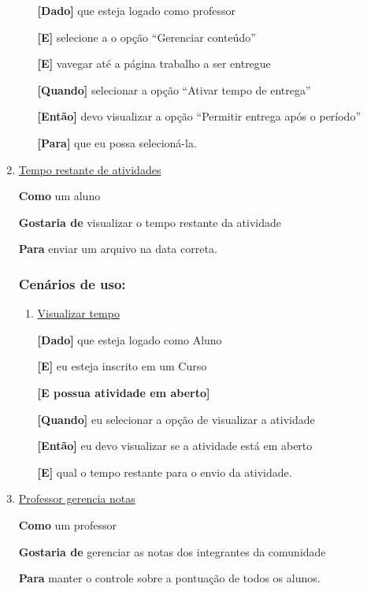 \begin{enumerate}
\begin{enumerate}
\textbf{[Dado]} que esteja logado como professor

\textbf{[E]} selecione a o opção ``Gerenciar conteúdo''

\textbf{[E]} vavegar até a página trabalho a ser entregue

\textbf{[Quando]} selecionar a opção ``Ativar tempo de entrega''

\textbf{[Então]} devo visualizar a opção ``Permitir entrega após o período''

\textbf{[Para]} que eu possa selecioná-la.

\end{enumerate}
\item \underline{Tempo restante de atividades}

\textbf{Como} um aluno

\textbf{Gostaria de} visualizar o tempo restante da atividade

\textbf{Para} enviar um arquivo na data correta.

\subsubsection*{Cenários de uso:}

\begin{enumerate}
\item \underline{Visualizar tempo}

\textbf{[Dado]} que esteja logado como Aluno

\textbf{[E]} eu esteja inscrito em um Curso

\textbf{[E possua atividade em aberto]}

\textbf{[Quando]} eu selecionar a opção de visualizar a atividade

\textbf{[Então]} eu devo visualizar se a atividade está em aberto

\textbf{[E]} qual o tempo restante para o envio da atividade.

\end{enumerate}

\item \underline{Professor gerencia notas}

\textbf{Como} um professor

\textbf{Gostaria de} gerenciar as notas dos integrantes da comunidade

\textbf{Para} manter o controle sobre a pontuação de todos os alunos.


\end{enumerate}
